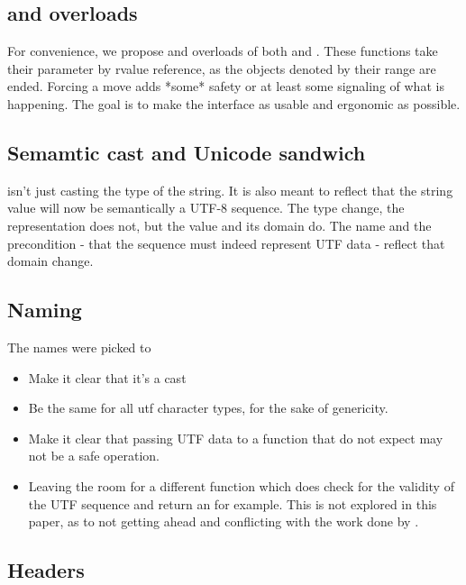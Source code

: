 \documentclass{wg21}
\begin{document}
\subsection{ and  overloads}

For convenience, we propose  and  overloads of both  and .
These functions take their parameter by rvalue reference, as the objects denoted by their range are ended. Forcing a move adds *some* safety or at least
some signaling of what is happening. The goal is to make the interface as usable and ergonomic as possible.

\subsection{Semamtic cast and Unicode sandwich}

 isn't just casting the type of the string.
It is also meant to reflect that the string value will now be semantically a UTF-8 sequence. The type change, the representation does not, but the value and its domain do.
The name and the precondition - that the sequence must indeed represent UTF data - reflect that domain change.

\subsection{Naming}
The names were picked to
\begin{itemize}
    \item Make it clear that it's a cast
    \item Be the same for all utf character types, for the sake of genericity.
    \item Make it clear that passing UTF data to a function that do not expect may not be a safe operation.
    \item Leaving the room for a different function which does check for the validity of the UTF sequence and return an  for example.
    This is not explored in this paper, as to not getting ahead and conflicting with the work done by .
\end{itemize}

\subsection{Headers}
\end{document}
